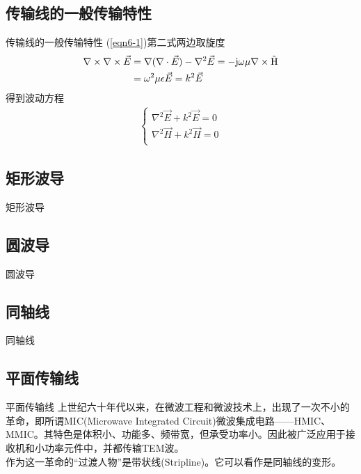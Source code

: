 \subsection{传输线的一般传输特性}
\begin{frame}{传输线的一般传输特性}
    (\ref{eqn6-1})第二式两边取旋度
    \begin{align*}
        \nabla\times\nabla\times\vec{E} & =\nabla(\nabla\cdot\vec{E})-\nabla^2\vec{E}=-\rm{j}\omega\mu\nabla\times\vec{H} \\
                                        & =\omega^2\mu\epsilon\vec{E}=k^2\vec{E}
    \end{align*}
    得到波动方程
    \begin{align}
        \begin{cases}
            \nabla^2\vec{E}+k^2\vec{E}=0 \\
            \nabla^2\vec{H}+k^2\vec{H}=0 \\
        \end{cases}\label{eqn6-2}
    \end{align}
\end{frame}

\subsection{矩形波导}
\begin{frame}{矩形波导}

\end{frame}

\subsection{圆波导}
\begin{frame}{圆波导}

\end{frame}

\subsection{同轴线}
\begin{frame}{同轴线}

\end{frame}

\subsection{平面传输线}
\begin{frame}{平面传输线}
    上世纪六十年代以来，在微波工程和微波技术上，出现了一次不小的革命，即所谓MIC(Microwave Integrated Circuit)微波集成电路——HMIC、MMIC。其特色是体积小、功能多、频带宽，但承受功率小。因此被广泛应用于接收机和小功率元件中，并都传输TEM波。\\
    作为这一革命的“过渡人物”是带状线(Stripline)。它可以看作是同轴线的变形。
\end{frame}






